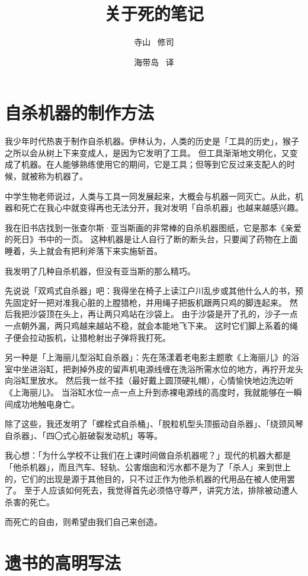\documentclass[UTF8]{ctexart}
\title{关于死的笔记}
\author{寺山 \ 修司}
\date{海带岛 \ 译}
\begin{document}
\maketitle

\newpage
\tableofcontents
\newpage

\section{自杀机器的制作方法}
我少年时代热衷于制作自杀机器。伊林认为，人类的历史是「工具的历史」，猴子之所以会从树上下来变成人，是因为它发明了工具。
但工具渐渐地文明化，又变成了机器。在人能够熟练使用它的期间，它是工具；但等到它反过来支配人的时候，就被称为机器了。

中学生物老师说过，人类与工具一同发展起来，大概会与机器一同灭亡。从此，机器和死亡在我心中就变得再也无法分开，我对发明「自杀机器」也越来越感兴趣。

我在旧书店找到一张查尔斯·亚当斯画的非常棒的自杀机器图纸，它是那本《亲爱的死日》书中的一页。
这种机器是让人自行了断的断头台，只要闻了药物在上面睡着，头上就会有把利斧落下来实施斩首。

我发明了几种自杀机器，但没有亚当斯的那么精巧。

先说说「双鸡式自杀器」吧：我得坐在椅子上读江户川乱步或其他什么人的书，预先固定好一把对准我心脏的上膛猎枪，并用绳子把扳机跟两只鸡的脚连起来。
然后我把沙袋顶在头上，再让两只鸡站在沙袋上。
由于沙袋是开了孔的，沙子一点一点朝外漏，两只鸡越来越站不稳，就会本能地飞下来。
这时它们脚上系着的绳子便会拉动扳机，让猎枪射出子弹将我打死。

另一种是「上海丽儿型浴缸自杀器」：先在荡漾着老电影主题歌《上海丽儿》的浴室中坐进浴缸，把剥掉外皮的留声机电源线缠在洗浴所需水位的地方，再拧开龙头向浴缸里放水。
然后我一丝不挂（最好戴上圆顶硬礼帽），心情愉快地边洗边听《上海丽儿》。
当浴缸水位一点一点上升到赤裸电源线的高度时，我就能够在一瞬间成功地触电身亡。

除了这些，我还发明了「螺栓式自杀桶」、「脱粒机型头顶振动自杀器」、「绕颈风琴自杀器」、「四〇式心脏破裂发动机」等等。

我心想：「为什么学校不让我们在上课时间做自杀机器呢？」现代的机器大都是「他杀机器」，而且汽车、轻轨、公害烟囱和污水都不是为了「杀人」来到世上的，它们的出现是源于其他目的，只不过正作为他杀机器的代用品在被人使用罢了。
至于人应该如何死去，我觉得首先必须恪守尊严，讲究方法，排除被动遭人杀害的死亡。

而死亡的自由，则希望由我们自己来创造。

\section{遗书的高明写法}
\end{document}
